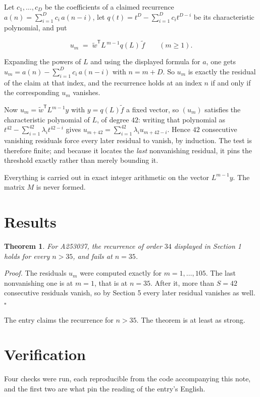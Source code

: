 \documentclass[11pt]{article}
\newtheorem{theorem}{Theorem}
\theoremstyle{definition}
\begin{document}
Let $c_1,\dots,c_D$ be the coefficients of a claimed recurrence $a(n) = \sum_{i=1}^{D} c_i\,a(n-i)$, let $q(t) = t^{D} - \sum_{i=1}^{D} c_i t^{D-i}$ be its characteristic polynomial, and put

\[u_m \;=\; \tilde w^{\mathsf T} L^{\,m-1} q(L)\,\tilde f \qquad (m \ge 1).\]

Expanding the powers of $L$ and using the displayed formula for $a$, one gets $u_m = a(n) - \sum_{i=1}^{D} c_i\,a(n-i)$ with $n = m + D$. So $u_m$ is exactly the residual of the claim at that index, and the recurrence holds at an index $n$ if and only if the corresponding $u_m$ vanishes.

Now $u_m = \tilde w^{\mathsf T} L^{m-1} y$ with $y = q(L)\tilde f$ a fixed vector, so $(u_m)$ satisfies the characteristic polynomial of $L$, of degree $42$: writing that polynomial as $t^{42} - \sum_{i=1}^{42} \lambda_i t^{42-i}$ gives $u_{m+42} = \sum_{i=1}^{42} \lambda_i u_{m+42-i}$. Hence $42$ consecutive vanishing residuals force every later residual to vanish, by induction. The test is therefore finite; and because it locates the {\itshape last} nonvanishing residual, it pins the threshold exactly rather than merely bounding it.

Everything is carried out in exact integer arithmetic on the vector $L^{m-1}y$. The matrix $M$ is never formed.

\section{Results}

\begin{theorem} For A253037, the recurrence of order $34$ displayed in Section 1 holds for every $n > 35$, and fails at $n = 35$.\end{theorem}

{\itshape Proof.} The residuals $u_m$ were computed exactly for $m = 1,\dots,105$. The last nonvanishing one is at $m = 1$, that is at $n = 35$. After it, more than $S = 42$ consecutive residuals vanish, so by Section 5 every later residual vanishes as well. $\square$

The entry claims the recurrence for $n > 35$. The theorem is at least as strong.

\section{Verification}

Four checks were run, each reproducible from the code accompanying this note, and the first two are what pin the reading of the entry's English.
\end{document}
